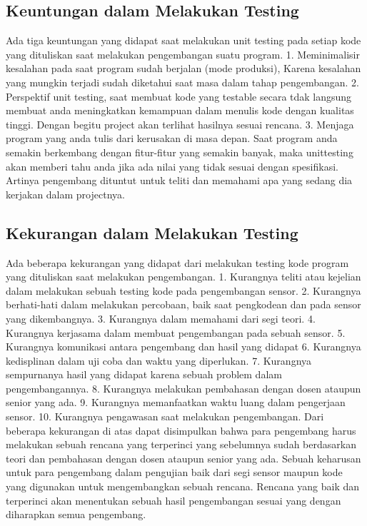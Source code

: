 \subsection {Keuntungan dalam Melakukan Testing}
Ada tiga keuntungan yang didapat saat melakukan unit testing pada setiap kode yang dituliskan saat melakukan pengembangan suatu program.
1.	Meminimalisir kesalahan pada saat program sudah berjalan (mode produksi), Karena kesalahan yang mungkin terjadi sudah diketahui saat masa dalam tahap pengembangan.
2.	Perspektif unit testing, saat membuat kode yang testable secara tdak langsung membuat anda meningkatkan kemampuan dalam menulis kode dengan kualitas tinggi. Dengan begitu project akan terlihat hasilnya sesuai rencana.
3.	Menjaga program yang anda tulis dari kerusakan di masa depan. Saat program anda semakin berkembang dengan fitur-fitur yang semakin banyak, maka unittesting akan memberi tahu anda jika ada nilai yang tidak sesuai dengan spesifikasi. Artinya pengembang dituntut untuk teliti dan memahami apa yang sedang dia kerjakan dalam projectnya.

\subsection {Kekurangan dalam Melakukan Testing}
Ada beberapa kekurangan yang didapat dari melakukan testing kode program yang dituliskan saat melakukan pengembangan.
1.	Kurangnya teliti atau kejelian dalam melakukan sebuah testing kode pada pengembangan sensor.
2.	Kurangnya berhati-hati dalam melakukan percobaan, baik saat pengkodean dan pada sensor yang dikembangnya.
3.	Kurangnya dalam memahami dari segi teori.
4.	Kurangnya kerjasama dalam membuat pengembangan pada sebuah sensor.
5.	Kurangnya komunikasi antara pengembang dan hasil yang didapat
6.	Kurangnya kedisplinan dalam uji coba dan waktu yang diperlukan.
7.	Kurangnya sempurnanya hasil yang didapat karena sebuah problem dalam pengembangannya.
8.	Kurangnya melakukan pembahasan dengan dosen ataupun senior yang ada.
9.	Kurangnya memanfaatkan waktu luang dalam pengerjaan sensor.
10.	Kurangnya pengawasan saat melakukan pengembangan.
Dari beberapa kekurangan di atas dapat disimpulkan bahwa para pengembang harus melakukan sebuah rencana yang terperinci yang sebelumnya sudah berdasarkan teori dan pembahasan dengan dosen ataupun senior yang ada. Sebuah keharusan untuk para pengembang dalam pengujian baik dari segi sensor maupun kode yang digunakan untuk mengembangkan sebuah rencana.
Rencana yang baik dan terperinci akan menentukan sebuah hasil pengembangan sesuai yang dengan diharapkan semua pengembang.

